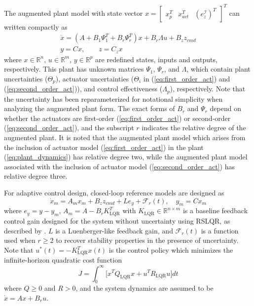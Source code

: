 The augmented plant model with state vector $x = \begin{bmatrix} x_p^T & x_{act}^T & (e_z^{\mathcal{I}})^T\end{bmatrix}^T$ can written compactly as
\begin{equation}
\begin{array}{c}
\dot{x}= \left(A+B_{1}\Psi_{1}^{T}+B_{r}\Psi_{r}^{T}\right) x+B_{r}\Lambda u+B_{z}z_{cmd}\\
y=Cx,\qquad z=C_{z}x
\end{array} \label{eq:augmented_plant}
\end{equation}
where $x\in\mathbb{R}^{n}$, $u\in\mathbb{R}^{m}$, $y\in\mathbb{R}^{p}$ are redefined states, inputs and outputs, respectively. This plant has unknown matrices $\Psi_1$, $\Psi_r$, and $\Lambda$, which contain plant uncertainties ($\Theta_p$), actuator uncertainties ($\Theta_i$ in (\ref{eq:first_order_act}) and (\ref{eq:second_order_act})), and control effectiveness ($\Lambda_p$), respectively. Note that the uncertainty has been reparameterized for notational simplicity when analyzing the augmented plant form. The exact forms of $B_r$ and $\Psi_r$ depend on whether the actuators are first-order (\ref{eq:first_order_act}) or second-order (\ref{eq:second_order_act}), and the subscript $r$ indicates the relative degree of the augmented plant. It is noted that the augmented plant model which arises from the inclusion of actuator model (\ref{eq:first_order_act}) in the plant (\ref{eq:plant_dynamics}) has relative degree two, while the augmented plant model associated with the inclusion of actuator model (\ref{eq:second_order_act}) has relative degree three. 

For adaptive control design, closed-loop reference models \cite{gibson2013adaptive} are designed as
\begin{equation}
\dot{x}_m = A_m x_m + B_z z_{cmd} + L e_y + \mathcal{F}_r(t), \quad y_m = C x_m \label{eq:crm_mimo}
\end{equation}
where $e_y = y - y_m$, $A_m = A - B_r K_{\textrm{LQR}}^T$ with $K_{\textrm{LQR}}\in\mathbb{R}^{n\times m}$ is a baseline feedback control gain designed for the system without uncertainty using RSLQR, as described by \cite{lavretsky2013robust}. $L$ is a Luenberger-like feedback gain, and $\mathcal{F}_r(t)$ is a function used when $r \geq 2$ to recover stability properties in the presence of uncertainty. Note that $u^*(t) = - K_{\textrm{LQR}}^T x(t)$ is the control policy which minimizes the infinite-horizon quadratic cost function
\begin{equation}
J = \int_0^\infty \big[ x^T Q_{\textrm{LQR}} x + u^T R_{\textrm{LQR}}	u\big] dt
\end{equation}
where $Q \geq 0$ and $R > 0$, and the system dynamics are assumed to be $\dot x = A x + B_r u$.

